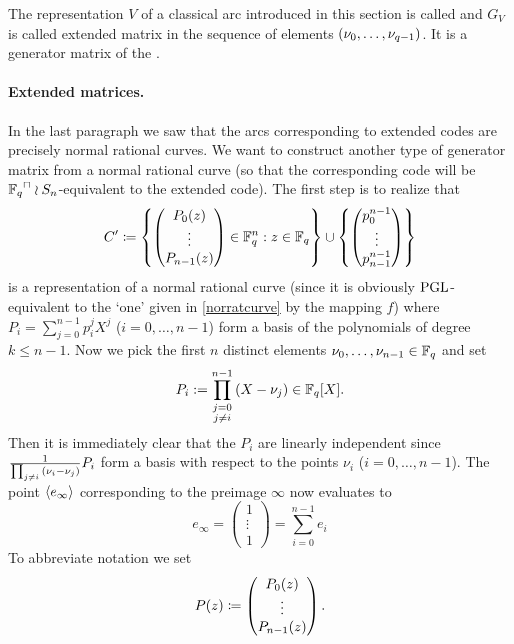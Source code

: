 The representation $V$ of a classical arc introduced in this section is called  and $G_V$ is called extended  matrix in the sequence of elements $\seq{\range{\nu_0}{\nu_{q-1}}}$.
It is a generator matrix of the .

\paragraph{Extended  matrices.}%
%
In the last paragraph we saw that the arcs corresponding to extended  codes are precisely normal rational curves.
We want to construct another type of generator matrix from a normal rational curve (so that the corresponding code will be $\units{\field{q}}\wr S_n$-equivalent to the extended  code).
The first step is to realize that 
$$ C' \defeq \set{
    \begin{pmatrix} P_0(z)             \\
        \vdots                         \\
        P_{n-1}(z)\end{pmatrix}\in\field{q}^n}[z\in \field{q}]
\setjoin\set{\begin{pmatrix} p^{n-1}_0 \\
        \vdots                         \\
        p^{n-1}_{n-1}\end{pmatrix}
} $$
is a representation of a normal rational curve (since it is obviously $\mathrm{PGL}$-equivalent to the `one' given in \autoref{norratcurve} by the mapping $f$) where $P_i=\sum_{j=0}^{n-1}{p_i^j X^j}$ ($i=0,\ldots,n-1$) form a basis of the polynomials of degree $k\leq n-1$. Now we pick the first $n$ distinct elements $\nu_0,\ldots,\nu_{n-1}\in\mathbb{F}_{q}$ and set
$$ P_i := \prod_{\substack{j=0\\ j\neq i}}^{n-1}{(X-\nu_j)}\in\mathbb{F}_{q}[X]\text{.} $$
Then it is immediately clear that the $P_i$ are linearly independent since $\frac 1 {\prod_{j\not= i}{(\nu_i-\nu_j)}}P_i$ form a  basis with respect to the points $\nu_i$ ($i=0,\ldots,n-1$). The point $\gen{e_{\infty}}$ corresponding to the preimage $\infty$ now evaluates to
$$ e_{\infty} = \begin{pmatrix} 1\\ \vdots\\ 1\end{pmatrix} = \sum_{i=0}^{n-1}{e_i}$$
To abbreviate notation we set
$$
P(z)\mathrel{\mathrel{\mathop:}\mkern-1.2mu=}\begin{pmatrix} P_0(z)\\ \vdots\\ P_{n-1}(z)\end{pmatrix}\textrm{.}
$$

